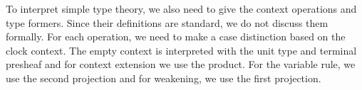 
To interpret simple type theory, we also need to give the context operations and type formers.
Since their definitions are standard, we do not discuss them formally.
For each operation, we need to make a case distinction based on the clock context.
The empty context is interpreted with the unit type and terminal presheaf and for context extension we use the product.
For the variable rule, we use the second projection and for weakening, we use the first projection.

